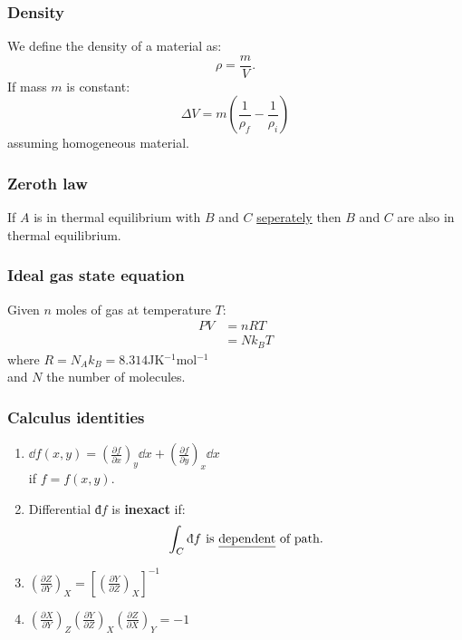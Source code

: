 \documentclass{article}
\newcommand{\idd}{\text{đ}}
\begin{document}
\begin{multicols*}{3}
\subsubsection*{Density}
We define the density of a material as:
$$\rho=\frac{m}{V}.$$
If mass $m$ is constant:
$$\Delta V=m\left(\frac{1}{\rho_f}
-\frac{1}{\rho_i}\right)$$
assuming homogeneous material.

\subsubsection*{Zeroth law}
If $A$ is in thermal equilibrium with $B$ and $C$
\underline{seperately} then $B$ and $C$
are also in thermal equilibrium.

\subsubsection*{Ideal gas state equation}
Given $n$ moles of gas at temperature $T$:
\begin{align*}
    PV&=nRT \\
    &=Nk_B T
\end{align*}
where $R=N_A k_B=8.314$JK$^{-1}$mol$^{-1}$ \\
and $N$ the number of molecules.

\subsubsection*{Calculus identities}
\begin{enumerate}
    \item $\displaystyle\dd f(x,y)
    =\left(\frac{\partial f}{\partial x}\right)_y \dd x
    +\left(\frac{\partial f}{\partial y}\right)_x \dd x
    $ \\
    if $f=f(x,y)$.

    \item Differential $\idd f$ is \textbf{inexact} if:
    $$\int_C \idd f
    \hspace{0.05in}\text{is \underline{dependent} of path}.$$

    \item $\displaystyle
    \left(\frac{\partial Z}{\partial Y}\right)_X
    =\left[\left(\frac{\partial Y}{\partial Z}\right)_X
    \right]^{-1}$

    \item $\displaystyle
    \left(\frac{\partial X}{\partial Y}\right)_Z
    \left(\frac{\partial Y}{\partial Z}\right)_X
    \left(\frac{\partial Z}{\partial X}\right)_Y
    =-1$
\end{enumerate}


\end{multicols*}
\end{document}
